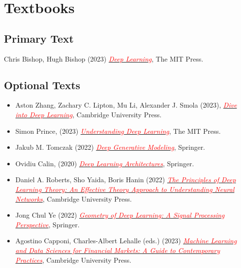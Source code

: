 \documentclass[11pt]{article}
\begin{document}
\section*{Textbooks}

\subsection*{Primary Text}

Chris Bishop, Hugh Bishop (2023) \href{https://www.bishopbook.com/}{\textcolor{red}{\textit{Deep Learning}}}, The MIT Press.

\subsection*{Optional Texts}

\begin{itemize}
  \item Aston Zhang, Zachary C. Lipton, Mu Li, Alexander J. Smola (2023), \href{https://d2l.ai/}{\textcolor{red}{\textit{Dive into Deep Learning}}}, Cambridge University Press.
  \item Simon Prince, (2023) \href{https://udlbook.github.io/udlbook/}{\textcolor{red}{\textit{Understanding Deep Learning}}}, The MIT Press.
  \item Jakub M. Tomczak (2022) \href{https://link.springer.com/book/10.1007/978-3-030-93158-2}{\textcolor{red}{\textit{Deep Generative Modeling}}}, Springer.
  \item Ovidiu Calin, (2020) \href{https://link.springer.com/book/10.1007/978-3-030-36721-3}{\textcolor{red}{\textit{Deep Learning Architectures}}}, Springer.
  \item Daniel A. Roberts, Sho Yaida, Boris Hanin (2022) \href{https://deeplearningtheory.com/}{\textcolor{red}{\textit{The Principles of Deep Learning Theory: An Effective Theory Approach to Understanding Neural Networks}}}, Cambridge University Press.
  \item Jong Chul Ye (2022) \href{https://link.springer.com/book/10.1007/978-981-16-6046-7}{\textcolor{red}{\textit{Geometry of Deep Learning: A Signal Processing Perspective}}}, Springer.
  \item Agostino Capponi, Charles-Albert Lehalle (eds.) (2023) \href{https://www.cambridge.org/core/books/machine-learning-and-data-sciences-for-financial-markets/8BB31611662A96D0AB93A8A26E2D0D0A}{\textcolor{red}{\textit{Machine Learning and Data Sciences for Financial Markets: A Guide to Contemporary Practices}}}, Cambridge University Press.
\end{itemize}
\end{document}
